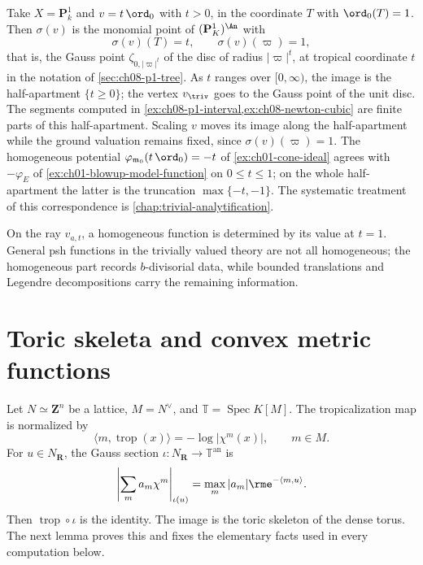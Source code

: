\begin{example}
\label{ex:ch08-gauss-ray}
Take $X=\mathbf P^1_k$ and $v=t\,\ord_0$ with $t>0$, in the coordinate $T$
with $\ord_0(T)=1$.  Then $\sigma(v)$ is the monomial point of
$(\mathbf P^1_K)^{\An}$ with
\[
 \sigma(v)(T)=t,\qquad \sigma(v)(\varpi)=1 ,
\]
that is, the Gauss point $\zeta_{0,|\varpi|^t}$ of the disc of radius
$|\varpi|^t$, at tropical coordinate $t$ in the notation of
\cref{sec:ch08-p1-tree}.  As $t$ ranges over $[0,\infty)$, the image is the
half-apartment $\{t\geq0\}$; the vertex $v_\triv$ goes to the Gauss point of
the unit disc.  The segments computed in
\cref{ex:ch08-p1-interval,ex:ch08-newton-cubic} are finite parts of this
half-apartment.  Scaling $v$ moves its image along the half-apartment while
the ground valuation remains fixed, since $\sigma(v)(\varpi)=1$.  The
homogeneous potential $\varphi_{\mathfrak m_0}(t\,\ord_0)=-t$ of
\cref{ex:ch01-cone-ideal} agrees with $-\varphi_E$ of
\cref{ex:ch01-blowup-model-function} on $0\leq t\leq1$; on the whole
half-apartment the latter is the truncation $\max\{-t,-1\}$.  The
systematic treatment of this correspondence is
\cref{chap:trivial-analytification}.
\end{example}

On the ray $v_{a,t}$, a homogeneous function is determined by its value at
$t=1$.  General psh functions in the trivially valued theory are not all
homogeneous; the homogeneous part records $b$-divisorial data, while bounded
translations and Legendre decompositions carry the remaining information.

\section{Toric skeleta and convex metric functions}
\label{sec:toric-convex}

Let $N\simeq\mathbf Z^n$ be a lattice, $M=N^\vee$, and
$\mathbb T=\operatorname{Spec}K[M]$.  The tropicalization map is normalized
by
\begin{equation}
\label{eq:toric-trop}
 \langle m,\operatorname{trop}(x)\rangle
 =-\log|\chi^m(x)|,
 \qquad m\in M.
\end{equation}
For $u\in N_{\mathbf R}$, the Gauss section $\iota:N_{\mathbf R}\to
\mathbb T^{\mathrm{an}}$ is
\begin{equation}
\label{eq:toric-gauss-section}
 \left|\sum_m a_m\chi^m\right|_{\iota(u)}
 =\max_m |a_m|\rme^{-\langle m,u\rangle}.
\end{equation}
Then $\operatorname{trop}\circ\iota$ is the identity.  The image is the
toric skeleton of the dense torus.  The next lemma proves this and fixes the
elementary facts used in every computation below.

